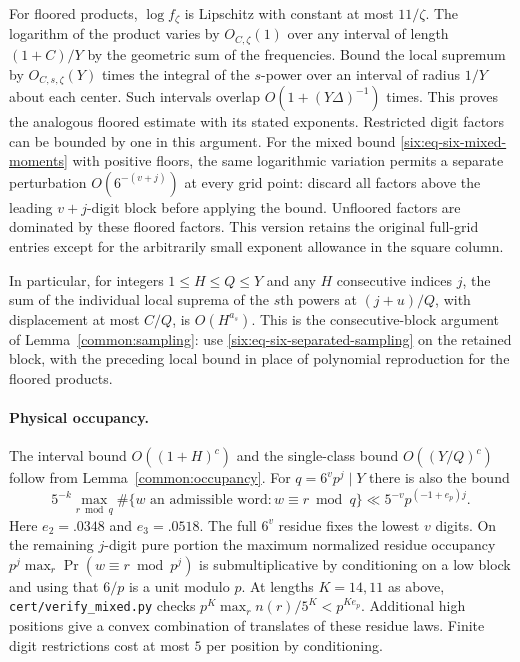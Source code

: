 \documentclass[11pt,a4paper]{article}
\theoremstyle{paperplain}
\numberwithin{equation}{section}
\begin{document}
For floored products, $\log f_\zeta$ is Lipschitz with constant at
most $11/\zeta$. The logarithm of the product varies by $O_{C,\zeta}(1)$
over any interval of length $(1+C)/Y$ by the geometric sum of the
frequencies. Bound the local supremum by $O_{C,s,\zeta}(Y)$ times
the integral of the $s$-power over an interval of radius $1/Y$
about each center. Such intervals overlap $O(1+(Y\Delta)^{-1})$
times. This proves the analogous floored estimate with its stated
exponents. Restricted digit factors can be bounded by one in this
argument. For the mixed bound \eqref{six:eq-six-mixed-moments} with
positive floors, the same logarithmic variation permits a separate
perturbation $O(6^{-(v+j)})$ at every grid point: discard all factors
above the leading $v+j$-digit block before applying the bound.
Unfloored factors are dominated by these floored factors. This version
retains the original full-grid entries except for the arbitrarily
small exponent allowance in the square column.

In particular, for integers $1\le H\le Q\le Y$ and any $H$
consecutive indices $j$, the sum of the individual local suprema of the $s$th powers
at $(j+u)/Q$, with displacement at most $C/Q$, is $O(H^{a_s})$.
This is the consecutive-block argument of Lemma~\ref{common:sampling}:
use \eqref{six:eq-six-separated-sampling} on the retained block,
with the preceding local bound in place of polynomial reproduction
for the floored products.

\paragraph{Physical occupancy.}
The interval bound $O((1+H)^c)$ and the single-class bound
$O((Y/Q)^c)$ follow from Lemma~\ref{common:occupancy}. For $q=6^v p^j\mid Y$
there is also the bound
\[
 5^{-k}\max_{r\bmod q}\#\{w\text{ an admissible word}:w\equiv r\bmod q\}
 \ll 5^{-v}p^{(-1+e_p)j}.
\]
Here $e_2=.0348$ and $e_3=.0518$.
The full $6^v$ residue fixes the lowest $v$ digits. On the remaining
$j$-digit pure portion the maximum normalized residue occupancy
$p^j\max_r\Pr(w\equiv r\bmod p^j)$ is submultiplicative by
conditioning on a low block and using that $6/p$ is a unit modulo $p$.
At lengths $K=14,11$ as above, \texttt{cert/verify\_mixed.py}
checks $p^K\max_r n(r)/5^K<p^{Ke_p}$. Additional high positions
give a convex combination of translates of these residue laws.
Finite digit restrictions cost at most $5$ per position by conditioning.
\end{document}
